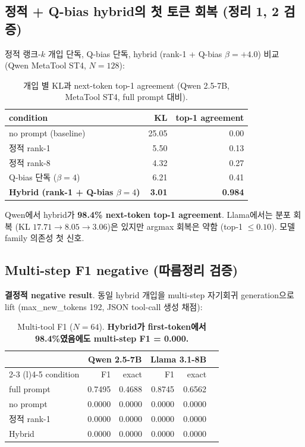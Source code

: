 \documentclass[11pt]{article}
\theoremstyle{definition}
\begin{document}
\subsection{정적 + Q-bias hybrid의 첫 토큰 회복 (정리 1, 2 검증)}
\label{sec:exp-static-qbias}

정적 랭크-$k$ 개입 단독, Q-bias 단독, hybrid (rank-1 + Q-bias $\beta = +4.0$) 비교 (Qwen MetaTool ST4, $N=128$):

\begin{table}[h]
\centering
\caption{개입 별 KL과 next-token top-1 agreement (Qwen 2.5-7B, MetaTool ST4, full prompt 대비).}
\label{tab:hybrid}
\small
\begin{tabular}{lrr}
\toprule
condition & KL & top-1 agreement \\
\midrule
no prompt (baseline) & 25.05 & 0.00 \\
정적 rank-1 & 5.50 & 0.13 \\
정적 rank-8 & 4.32 & 0.27 \\
Q-bias 단독 ($\beta=4$) & 6.21 & 0.41 \\
\textbf{Hybrid (rank-1 + Q-bias $\beta=4$)} & \textbf{3.01} & \textbf{0.984} \\
\bottomrule
\end{tabular}
\end{table}

Qwen에서 hybrid가 \textbf{98.4\% next-token top-1 agreement}. Llama에서는 분포 회복 (KL $17.71 \to 8.05 \to 3.06$)은 있지만 argmax 회복은 약함 (top-1 $\le 0.10$). 모델 family 의존성 첫 신호.

\subsection{Multi-step F1 negative (따름정리 검증)}
\label{sec:exp-multistep}

\textbf{결정적 negative result}. 동일 hybrid 개입을 multi-step 자기회귀 generation으로 lift (max\_new\_tokens 192, JSON tool-call 생성 채점):

\begin{table}[h]
\centering
\caption{Multi-tool F1 ($N=64$). \textbf{Hybrid가 first-token에서 98.4\%였음에도 multi-step F1 = 0.000.}}
\label{tab:multistep}
\small
\begin{tabular}{lrrrrr}
\toprule
& \multicolumn{2}{c}{Qwen 2.5-7B} & \multicolumn{2}{c}{Llama 3.1-8B} \\
\cmidrule(r){2-3} \cmidrule(l){4-5}
condition & F1 & exact & F1 & exact \\
\midrule
full prompt        & 0.7495 & 0.4688 & 0.8745 & 0.6562 \\
no prompt          & 0.0000 & 0.0000 & 0.0000 & 0.0000 \\
정적 rank-1        & 0.0000 & 0.0000 & 0.0000 & 0.0000 \\
Hybrid             & 0.0000 & 0.0000 & 0.0000 & 0.0000 \\
\bottomrule
\end{tabular}
\end{table}
\end{document}

